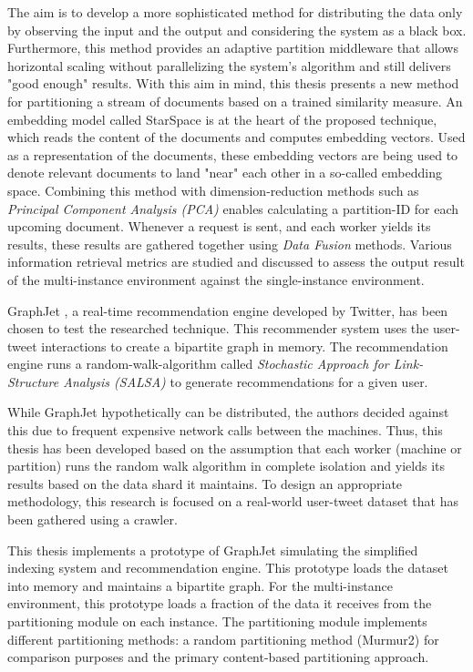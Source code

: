 The aim is to develop a more sophisticated method for distributing the data only by observing the input and the output and considering the system as a black box. Furthermore, this method provides an adaptive partition middleware that allows horizontal scaling without parallelizing the system's algorithm and still delivers "good enough" results. With this aim in mind, this thesis presents a new method for partitioning a stream of documents based on a trained similarity measure. An embedding model called StarSpace \cite{wuStarSpaceEmbedAll2017} is at the heart of the proposed technique, which reads the content of the documents and computes embedding vectors. Used as a representation of the documents, these embedding vectors are being used to denote relevant documents to land "near" each other in a so-called embedding space. Combining this method with dimension-reduction methods such as \emph{Principal Component Analysis (PCA)} \cite{woldPrincipalComponentAnalysis1987} enables calculating a partition-ID for each upcoming document. Whenever a request is sent, and each worker yields its results, these results are gathered together using \emph{Data Fusion} methods. Various information retrieval metrics are studied and discussed to assess the output result of the multi-instance environment against the single-instance environment.


GraphJet \cite{sharmaGraphJetRealtimeContent2016}, a real-time recommendation engine developed by Twitter, has been chosen to test the researched technique. This recommender system uses the user-tweet interactions to create a bipartite graph in memory. The recommendation engine runs a random-walk-algorithm called \emph{Stochastic Approach for Link-Structure Analysis (SALSA)} \cite{lempelSALSAStochasticApproach2001} to generate recommendations for a given user. 


While GraphJet hypothetically can be distributed, the authors decided against this due to frequent expensive network calls between the machines. Thus, this thesis has been developed based on the assumption that each worker (machine or partition) runs the random walk algorithm in complete isolation and yields its results based on the data shard it maintains. To design an appropriate methodology, this research is focused on a real-world user-tweet dataset that has been gathered using a crawler. 


This thesis implements a prototype of GraphJet simulating the simplified indexing system and recommendation engine. This prototype loads the dataset into memory and maintains a bipartite graph. For the multi-instance environment, this prototype loads a fraction of the data it receives from the partitioning module on each instance. The partitioning module implements different partitioning methods: a random partitioning method (Murmur2) for comparison purposes and the primary content-based partitioning approach.


